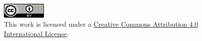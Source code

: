 %
%
\begin{figure}[h]
\centering
\includegraphics[height=0.3in]{common/assets/images/CC-BY-4_88x31.png}
\caption*{This work is licensed under a
\href{http://creativecommons.org/licenses/by/4.0/}{Creative Commons Attribution 4.0 International License}.}
\end{figure}
